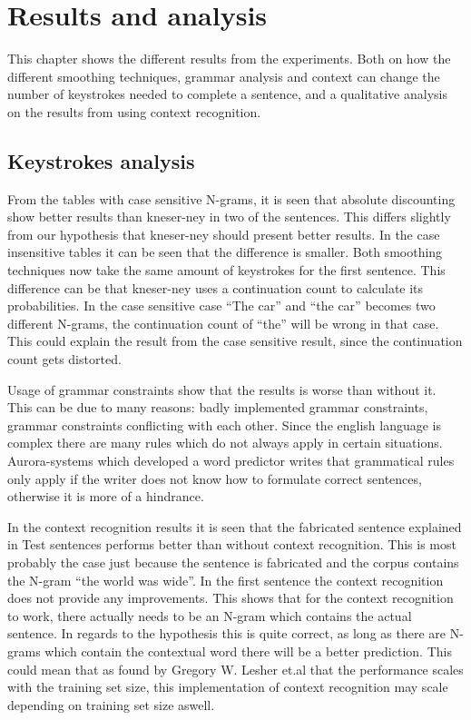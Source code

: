 \section{Results and analysis}
This chapter shows the different results from the experiments. Both on how the different smoothing techniques, grammar analysis and context can change the number of keystrokes needed to complete a sentence, and a qualitative analysis on the results from using context recognition.

\subsection{Keystrokes analysis}
From the tables with case sensitive N-grams, it is seen that absolute discounting show better results than kneser-ney in two of the sentences. This differs slightly from our hypothesis that kneser-ney should present better results. In the case insensitive tables it can be seen that the difference is smaller. Both smoothing techniques now take the same amount of keystrokes for the first sentence. This difference can be that kneser-ney uses a continuation count to calculate its probabilities. In the case sensitive case “The car” and “the car” becomes two different N-grams, the continuation count of “the” will be wrong in that case. This could explain the result from the case sensitive result, since the continuation count gets distorted. 

Usage of grammar constraints show that the results is worse than without it. This can be due to many reasons: badly implemented grammar constraints, grammar constraints conflicting with each other. Since the english language is complex there are many rules which do not always apply in certain situations. Aurora-systems which developed a word predictor writes that grammatical rules only apply if the writer does not know how to formulate correct sentences, otherwise it is more of a hindrance\cite{aurora}.

In the context recognition results it is seen that the fabricated sentence explained in Test sentences performs better than without context recognition. This is most probably the case just because the sentence is fabricated and the corpus contains the N-gram “the world was wide”. In the first sentence the context recognition does not provide any improvements. This shows that for the context recognition to work, there actually needs to be an N-gram which contains the actual sentence. In regards to the hypothesis this is quite correct, as long as there are N-grams which contain the contextual word there will be a better prediction. This could mean that as found by Gregory W. Lesher et.al that the performance scales with the training set size\cite{Lesher99effectsof}, this implementation of context recognition may scale depending on training set size aswell.
\vspace{1em}
